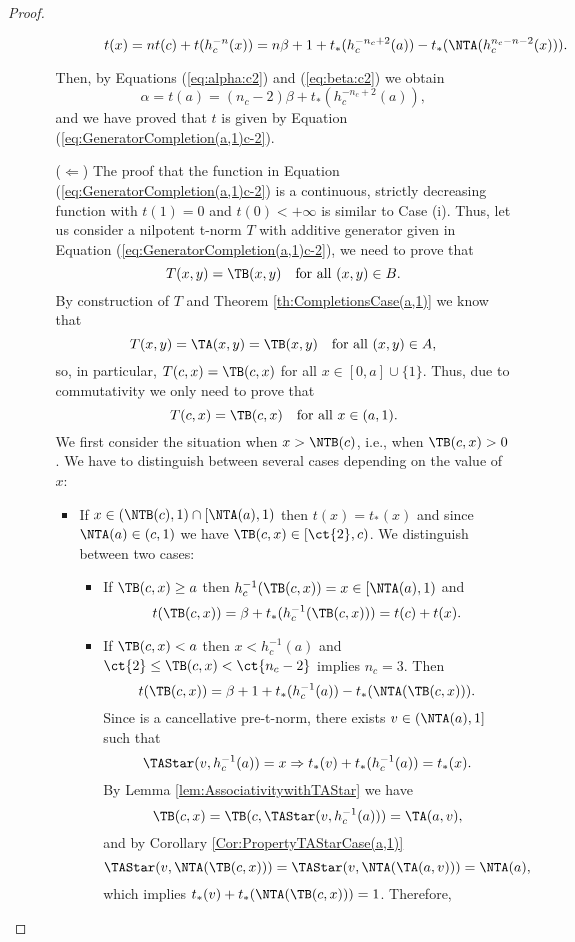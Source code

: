 \begin{proof}
\begin{enumerate}[label=(\roman*)]
\begin{itemize}
\begin{itemize}
\begin{itemize}
					$$ t(x) = nt(c)+ t(h_c^{-n}(x)) = n\beta+ 1 + t_*(h_c^{-n_c+2}(a)) -t_*(\NTA(h_c^{n_c-n-2}(x))).$$
				\end{itemize}
			\end{itemize}
			Then, by Equations (\ref{eq:alpha:c2}) and (\ref{eq:beta:c2}) we obtain
			$$\alpha=t(a) = (n_c-2)\beta+ t_*(h_c^{-n_c+2}(a)),$$
			and we have proved that $t$ is given by Equation (\ref{eq:GeneratorCompletion(a,1)c-2}).
			\item[($\Leftarrow$)]  The proof that the function in Equation (\ref{eq:GeneratorCompletion(a,1)c-2}) is a continuous, strictly decreasing function with $t(1)=0$ and $t(0)<+\infty$ is similar to Case (i). Thus, let us consider a nilpotent t-norm $T$ with additive generator given in Equation (\ref{eq:GeneratorCompletion(a,1)c-2}), we need to prove that
			$$T(x,y)=\TB(x,y) \quad \text{for all } (x,y) \in B.$$
			By construction of $T$ and Theorem \ref{th:CompletionsCase(a,1)} we know that
			$$T(x,y)= \TA(x,y)=\TB(x,y) \quad \text{for all } (x,y) \in A,$$
			so, in particular, $T(c,x)=\TB(c,x)$ for all $x \in [0,a] \cup \{1\}$. Thus, due to commutativity we only need to prove that
			$$T(c,x)=\TB(c,x) \quad \text{for all } x \in (a,1).$$
			We first consider the situation when $x > \NTB(c)$, i.e., when $\TB(c,x)>0$. We have to distinguish between several cases depending on the value of $x$:
			\begin{itemize}
				\item If $x \in (\NTB(c),1) \cap [\NTA(a),1)$ then $t(x)=t_*(x)$ and since $\NTA(a) \in (c,1)$ we have $\TB(c,x) \in [\ct{2},c)$. We distinguish between two cases:
				\begin{itemize}
					\item If $\TB(c,x) \geq a$ then $h_c^{-1}(\TB(c,x))=x \in [\NTA(a),1)$ and
					$$t(\TB(c,x)) = \beta + t_*(h_c^{-1}(\TB(c,x))) = t(c)+t(x).$$
					\item If $\TB(c,x) < a$ then $x< h_c^{-1}(a)$ and $\ct{2}\leq\TB(c,x) < \ct{n_c-2}$ implies $n_c=3$. Then
					$$t(\TB(c,x)) = \beta + 1 + t_*(h_c^{-1}(a))-t_*(\NTA(\TB(c,x))).$$
					Since \TAStar is a cancellative pre-t-norm, there exists $v \in (\NTA(a),1]$ such that $$\TAStar(v,h_c^{-1}(a))=x \Rightarrow t_*(v)+t_*(h_c^{-1}(a))=t_*(x).$$
					By Lemma \ref{lem:AssociativitywithTAStar} we have
					$$\TB(c,x)=\TB(c,\TAStar(v,h_c^{-1}(a)))=\TA(a,v),$$
					and by Corollary \ref{Cor:PropertyTAStarCase(a,1)}
					$$\TAStar(v,\NTA(\TB(c,x))) = \TAStar(v,\NTA(\TA(a,v))) = \NTA(a),$$
					which implies $t_*(v)+t_*(\NTA(\TB(c,x)))=1$. Therefore,
					$$
$$
\end{itemize}
\end{itemize}
\end{itemize}
\end{enumerate}
\end{proof}

